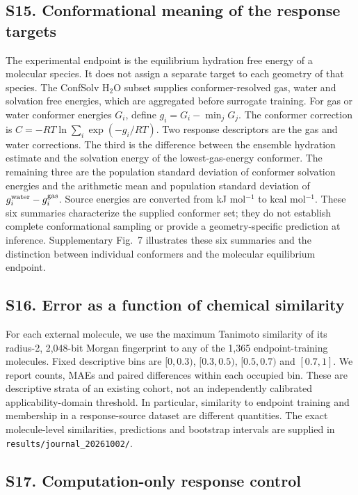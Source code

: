 \subsection*{S15. Conformational meaning of the response targets}

The experimental endpoint is the equilibrium hydration free energy of a molecular
species. It does not assign a separate target to each geometry of that species.
The ConfSolv H$_2$O subset supplies conformer-resolved gas, water and solvation free energies,
which are aggregated before surrogate training. For gas or water conformer
energies $G_i$, define $g_i=G_i-\min_j G_j$. The conformer correction is
$C=-RT\ln\sum_i\exp(-g_i/RT)$. Two response descriptors are the gas and water
corrections. The third is the difference between the ensemble hydration estimate
and the solvation energy of the lowest-gas-energy conformer. The remaining three
are the population standard deviation of conformer solvation energies and the
arithmetic mean and population standard deviation of
$g_i^{\rm water}-g_i^{\rm gas}$. Source energies are converted from kJ mol$^{-1}$
to kcal mol$^{-1}$. These six summaries characterize the supplied conformer set;
they do not establish complete conformational sampling or provide a geometry-specific
prediction at inference.
Supplementary Fig.~7 illustrates these six summaries and the distinction between
individual conformers and the molecular equilibrium endpoint.

\subsection*{S16. Error as a function of chemical similarity}

For each external molecule, we use the maximum Tanimoto similarity of its
radius-2, 2,048-bit Morgan fingerprint to any of the 1,365 endpoint-training
molecules. Fixed descriptive bins are $[0,0.3)$, $[0.3,0.5)$, $[0.5,0.7)$ and
$[0.7,1]$. We report counts, MAEs and paired differences within each occupied bin.
These are descriptive strata of an existing cohort, not an independently calibrated
applicability-domain threshold. In particular, similarity to endpoint training and
membership in a response-source dataset are different quantities. The exact
molecule-level similarities, predictions and bootstrap intervals are supplied in
\texttt{results/journal\_20261002/}.

\subsection*{S17. Computation-only response control}

